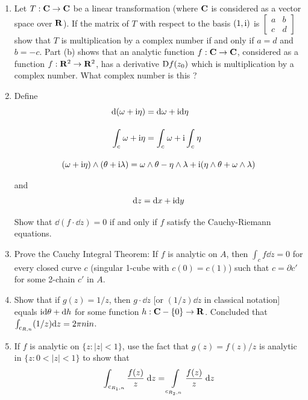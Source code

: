\begin{problems}
{\begin{enumerate}[label=(\alph*)]
                \textit{Hint}:Use the fact that $\lim_{z\to z_0}{[f(z)-f(z_0)]/(z-z_0)}$ must 
                be the same for $z=z_0+(x+\R{i}\cdot 0)$ and $z=z_0+(0+\R{i}\cdot y)$ with 
                $x,y\to 0$. (The converse is also true, if $u$ and $v$ are continuously differentiable;
                this is more difficult to prove.)
            \item Let $T:\mathbf{C}\to \mathbf{C}$ be a linear transformation (where $\mathbf{C}$ is considered 
                as a vector space over $\mathbf{R}$). If the matrix of $T$ with respect to the 
                basis $(1,\mathrm{i})$ is $\begin{bmatrix}a & b\\c & d\end{bmatrix}$ show that
                $T$ is multiplication by a complex number if and only if $a=d$ and $b=-c$. Part (b)
                shows that an analytic function $f:\mathbf{C}\to\mathbf{C}$, considered as a function $f:\mathbf{R}^2\to\mathbf{R}^2$,
                has a derivative $\mathrm{D}f(z_0)$ which is multiplication by a complex number. What complex number
                is this ?
            \item Define 
                \begin{align*}
                    \mathrm{d}(\omega + \mathrm{i}\eta) & = \mathrm{d}\omega + \mathrm{i}\mathrm{d}\eta \\[1em]
                    \int_{c}^{}{\omega + \mathrm{i}\eta} & = \int_{c}^{}\omega + \mathrm{i}\int_{c}^{}\eta \\[1em]
                    (\omega+\mathrm{i}\eta)\wedge(\theta+\mathrm{i}\lambda)
                        = \omega&\wedge\theta - \eta\wedge\lambda + \mathrm{i}(\eta\wedge\theta + \omega\wedge\lambda)
                \end{align*}

                and 
                \begin{align*}
                    \mathrm{d} z = \mathrm{d} x + \mathrm{i}\mathrm{d} y
                \end{align*}

                Show that $\dd(f\cdot\dd z)=0$ if and only if $f$ satisfy the Cauchy-Riemann equations.
            \item Prove the Cauchy Integral Theorem: If $f$ is analytic on $A$,
                then $\int_c f \dd z = 0$ for every closed curve $c$ (singular 1-cube with
                $c(0) = c(1)$) such that $c = \partial c'$ for some 2-chain $c'$ in $A$.
            \item Show that if $g(z)=1/z$, then $g\cdot\dd z$ [or $(1/z)\dd z$ in classical notation]
                equals $\mathrm{i}\mathrm{d}\theta + \mathrm{d} h$ for some function $h:\mathbf{C}-\{0\}\to\mathbf{R}$. Concluded
                that $\int_{c_{R,n}}(1/z)\mathrm{d} z = 2\pi n \mathrm{i}n$.
            \item If $f$ is analytic on $\{z: |z| < 1\}$, use the fact that $g(z)=f(z)/z$ is 
                analytic in $\{z: 0 < |z| < 1\}$ to show that
                \begin{align*}
                    \int_{c_{R_1,n}}\frac{f(z)}z\;\dd z=\intop_{c_{R_2,n}}\frac{f(z)}z\;\dd z
                \end{align*}


\end{enumerate}}
\end{problems}
